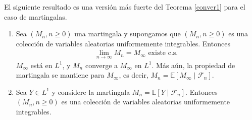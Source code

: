 El siguiente resultado es una versión más fuerte del Teorema \ref{conver1} para el caso de martingalas.

\begin{theorem}
\label{cerrada_uniforme}
	\begin{enumerate}
	\item Sea $(M_n, n \geq 0)$ una martingala y supongamos que $(M_n, n \geq 0)$ es una colección de variables aleatorias uniformemente integrables. Entonces
	\begin{align*}
	\lim_{n \rightarrow \infty} M_n = M_{\infty} \text{ existe c.s. }
	\end{align*}
	$M_{\infty}$ está en $L^1$, y $M_n$ converge a $M_{\infty}$ en $L^1$. Más aún, la propiedad de martingala se mantiene para $M_{\infty}$, es decir, $M_n = \mathbb{E} \left[ M_{\infty} \mid \mathcal{F}_n \right]$.
	
	\item Sea $Y \in L^1$ y considere la martingala $M_n = \mathbb{E} \left[ Y \mid \mathcal{F}_n \right]$. Entonces $(M_n, n \geq 0)$ es una colección de variables aleatorias uniformemente integrables.
	\end{enumerate}
\end{theorem}
